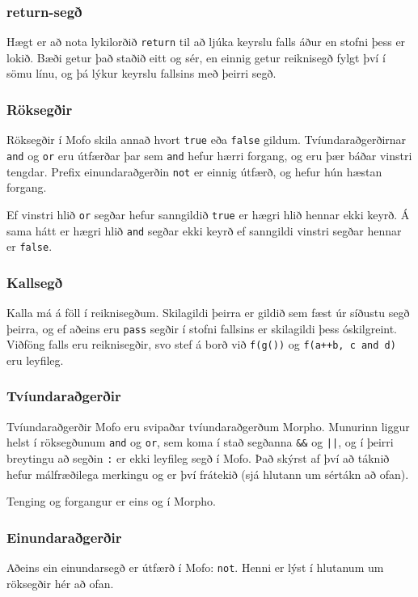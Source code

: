 \documentclass[12pt,a4paper]{article}
\begin{document}
\subsubsection{return-segð}
Hægt er að nota lykilorðið {\tt return} til að ljúka keyrslu falls áður en stofni þess er lokið. Bæði getur það staðið eitt og sér, en einnig getur
reiknisegð fylgt því í sömu línu, og þá lýkur keyrslu fallsins með þeirri segð.

\subsubsection{Röksegðir}
Röksegðir í Mofo skila annað hvort {\tt true} eða {\tt false} gildum. Tvíundaraðgerðirnar {\tt and} og {\tt or} eru útfærðar þar sem {\tt and} hefur hærri forgang,
og eru þær báðar vinstri tengdar. Prefix einundaraðgerðin {\tt not} er einnig útfærð, og hefur hún hæstan forgang.

Ef vinstri hlið {\tt or} segðar hefur sanngildið {\tt true} er hægri hlið hennar ekki keyrð. Á sama hátt er hægri hlið {\tt and} segðar ekki keyrð ef sanngildi
vinstri segðar hennar er {\tt false}.

\subsubsection{Kallsegð}
Kalla má á föll í reiknisegðum. Skilagildi þeirra er gildið sem fæst úr síðustu segð þeirra, og ef aðeins eru {\tt pass} segðir í stofni fallsins er skilagildi þess
óskilgreint. Viðföng falls eru reiknisegðir, svo stef á borð við {\tt f(g())} og {\tt f(a++b, c and d)} eru leyfileg.

\subsubsection{Tvíundaraðgerðir}
Tvíundaraðgerðir Mofo eru svipaðar tvíundaraðgerðum Morpho. Munurinn liggur helst í röksegðunum {\tt and} og {\tt or}, sem koma í stað segðanna {\tt \&\&} og {\tt ||}, og
í þeirri breytingu að segðin {\tt :} er ekki leyfileg segð í Mofo. Það skýrst af því að táknið hefur málfræðilega merkingu og er því frátekið (sjá hlutann um sértákn að ofan).

Tenging og forgangur er eins og í Morpho.

\subsubsection{Einundaraðgerðir}
Aðeins ein einundarsegð er útfærð í Mofo: {\tt not}. Henni er lýst í hlutanum um röksegðir hér að ofan.
\end{document}
